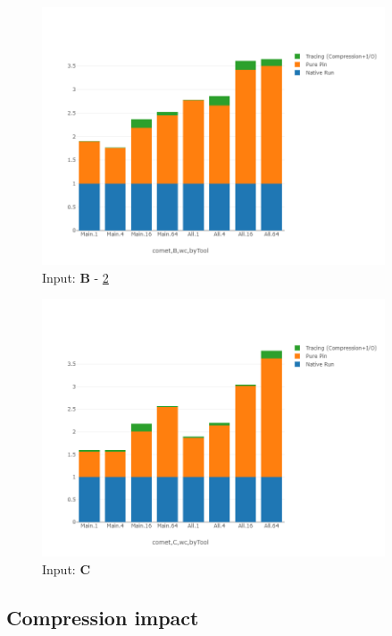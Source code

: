 



\begin{figure}[!t]
\centering
\includegraphics[width=4in]{figs.comet.newMed/comet_chartDet_B_wc_byTool_p3_5.png}
\caption{ Input: \textbf{B} - \ref{comet_chartDet_C_wc_byTool_p3_5} 
}
\label{comet_chartDet_B_wc_byTool_p3_5}
\end{figure}


\begin{figure}[!t]
\centering
\includegraphics[width=4in]{figs.comet.newMed/comet_chartDet_C_wc_byTool_p3_5.png}
\caption{ Input: \textbf{C}
}
\label{comet_chartDet_C_wc_byTool_p3_5}
\end{figure}






\subsection{Compression impact} 
\label{subsec:compact}

